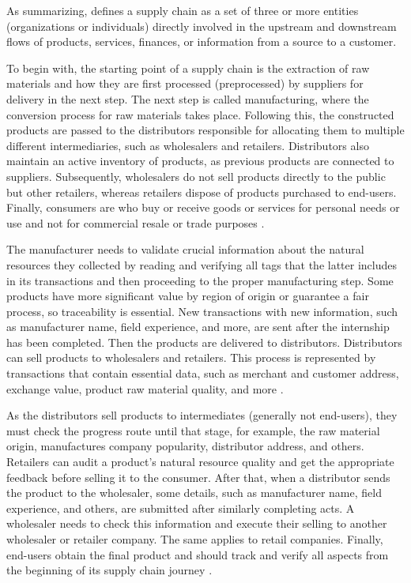 As summarizing, \cite{mentzer2001defining} defines a supply chain as a set of three or more entities (organizations or individuals) directly involved in the upstream and downstream flows of products, services, finances, or information from a source to a customer. 


To begin with, the starting point of a supply chain is the extraction of raw materials and how they are first processed (preprocessed) by suppliers for delivery in the next step. The next step is called manufacturing, where the conversion process for raw materials takes place. Following this, the constructed products are passed to the distributors responsible for allocating them to multiple different intermediaries, such as wholesalers and retailers. Distributors also maintain an active inventory of products, as previous products are connected to suppliers. Subsequently, wholesalers do not sell products directly to the public but other retailers, whereas retailers dispose of products purchased to end-users. Finally, consumers are who buy or receive goods or services for personal needs or use and not for commercial resale or trade purposes \cite{litke2019blockchains}.

The manufacturer needs to validate crucial information about the natural resources they collected by reading and verifying all tags that the latter includes in its transactions and then proceeding to the proper manufacturing step. Some products have more significant value by region of origin or guarantee a fair process, so traceability is essential. New transactions with new information, such as manufacturer name, field experience, and more, are sent after the internship has been completed. Then the products are delivered to distributors. Distributors can sell products to wholesalers and retailers. This process is represented by transactions that contain essential data, such as merchant and customer address, exchange value, product raw material quality, and more \cite{sauer2018extending}. 

As the distributors sell products to intermediates (generally not end-users), they must check the progress route until that stage, for example, the raw material origin, manufactures company popularity, distributor address, and others. Retailers can audit a product's natural resource quality and get the appropriate feedback before selling it to the consumer.   After that,  when a distributor sends the product to the wholesaler, some details, such as manufacturer name, field experience, and others, are submitted after similarly completing acts. A wholesaler needs to check this information and execute their selling to another wholesaler or retailer company. The same applies to retail companies. Finally, end-users obtain the final product and should track and verify all aspects from the beginning of its supply chain journey \cite{litke2019blockchains}. 

